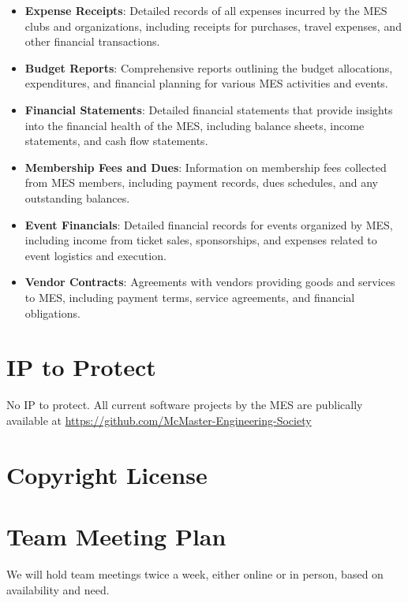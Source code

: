 \documentclass{article}
\begin{document}
\begin{itemize}
  \item \textbf{Expense Receipts}: Detailed records of all expenses incurred by the MES clubs and organizations, including receipts for purchases, travel expenses, and other financial transactions.
  \item \textbf{Budget Reports}: Comprehensive reports outlining the budget allocations, expenditures, and financial planning for various MES activities and events.
  \item \textbf{Financial Statements}: Detailed financial statements that provide insights into the financial health of the MES, including balance sheets, income statements, and cash flow statements.
  \item \textbf{Membership Fees and Dues}: Information on membership fees collected from MES members, including payment records, dues schedules, and any outstanding balances.
  \item \textbf{Event Financials}: Detailed financial records for events organized by MES, including income from ticket sales, sponsorships, and expenses related to event logistics and execution.
  \item \textbf{Vendor Contracts}: Agreements with vendors providing goods and services to MES, including payment terms, service agreements, and financial obligations.
\end{itemize}


\section{IP to Protect}
No IP to protect. All current software projects by the MES are publically available at \href{https://github.com/McMaster-Engineering-Society}{https://github.com/McMaster-Engineering-Society}


\section{Copyright License}


\section{Team Meeting Plan}
We will hold team meetings twice a week, either online or in person, based on availability and need.
\end{document}
